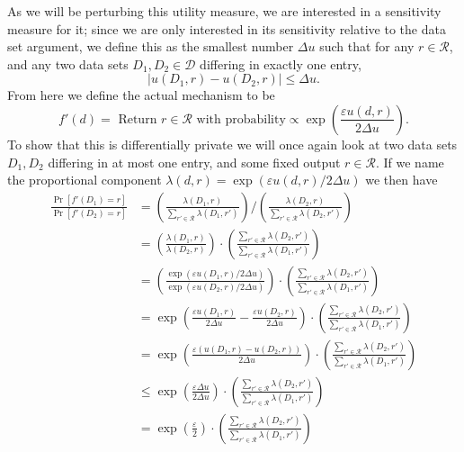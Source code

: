 \documentclass[a4paper,12pt]{article}
\newcommand{\fancy}{\mathcal}
\renewcommand{\epsilon}{\varepsilon}
\begin{document}
As we will be perturbing this utility measure, we are interested in a sensitivity measure for it; since we are only interested in its sensitivity relative to the data set argument, we define this as the smallest number $\Delta u$ such that for any $r \in \fancy{R}$, and any two data sets $D_1,D_2 \in \fancy{D}$ differing in exactly one entry,
\begin{equation}\label{eq:utility_sensitivity}
    |u(D_1,r) - u(D_2,r)| \leq \Delta u.
\end{equation}
From here we define the actual mechanism to be
\begin{equation*}
    f'(d) = \text{ Return } r \in \fancy{R} \text{ with probability} \propto \exp\left( \frac{\epsilon u(d,r)}{2\Delta u} \right).
\end{equation*}
To show that this is differentially private we will once again look at two data sets $D_1,D_2$ differing in at most one entry, and some fixed output $r \in \fancy{R}$. If we name the proportional component $\lambda(d,r) = \exp \left( \epsilon u(d,r) / 2 \Delta u \right)$ we then have
\begin{align}
    \frac{\Pr[f'(D_1) = r]}{\Pr[f'(D_2) = r]} &= 
                \left( \frac{\lambda(D_1,r)}{\sum_{r' \in \fancy{R}} \lambda(D_1,r')} \right)
                /
                \left( \frac{\lambda(D_2,r)}{\sum_{r' \in \fancy{R}} \lambda(D_2,r')} \right) \nonumber\\
            &= \left( \frac{\lambda(D_1,r)}{\lambda(D_2,r)} \right) \cdot \left( \frac{\sum_{r'\in\fancy{R}} \lambda(D_2,r')}{\sum_{r'\in\fancy{R}} \lambda(D_1,r')} \right) \nonumber\\
            &= \left( \frac{\exp(\epsilon u(D_1,r)/2\Delta u)}{\exp(\epsilon u(D_2,r)/2\Delta u)} \right) \cdot \left( \frac{\sum_{r'\in\fancy{R}} \lambda(D_2,r')}{\sum_{r'\in\fancy{R}} \lambda(D_1,r')} \right) \nonumber\\
            &= \exp \left( \frac{\epsilon u(D_1,r)}{2\Delta u} - \frac{\epsilon u(D_2,r)}{2\Delta u} \right) \cdot \left( \frac{\sum_{r'\in\fancy{R}} \lambda(D_2,r')}{\sum_{r'\in\fancy{R}} \lambda(D_1,r')} \right) \nonumber\\
            &= \exp \left( \frac{\epsilon (u(D_1,r) - u(D_2,r))}{2\Delta u}\right) \cdot \left( \frac{\sum_{r'\in\fancy{R}} \lambda(D_2,r')}{\sum_{r'\in\fancy{R}} \lambda(D_1,r')} \right) \nonumber\\
            &\leq \exp \left( \frac{\epsilon \Delta u}{2\Delta u}\right) \cdot \left( \frac{\sum_{r'\in\fancy{R}} \lambda(D_2,r')}{\sum_{r'\in\fancy{R}} \lambda(D_1,r')} \right) \nonumber\\
            &= \exp \left( \frac{\epsilon}{2} \right) \cdot \left( \frac{\sum_{r'\in\fancy{R}} \lambda(D_2,r')}{\sum_{r'\in\fancy{R}} \lambda(D_1,r')} \right) \label{eq:expmech}
\end{align}
\end{document}
